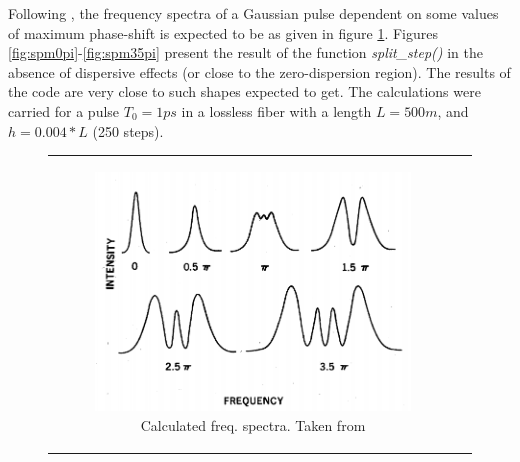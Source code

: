     Following \citep{stolen}, the frequency spectra of a Gaussian pulse dependent on some values of maximum phase-shift is expected to be as given in figure \ref{fig:spmstol}. Figures \ref{fig:spm0pi}-\ref{fig:spm35pi} present the result of the function \emph{split\_step()} in the absence of dispersive effects (or close to the zero-dispersion region). The results of the code are very close to such shapes expected to get. The calculations were carried for a pulse $T_0 = 1ps$ in a lossless fiber with a length $L = 500m$, and $h = 0.004*L$ (250 steps).
    
     \begin{figure}[label={fig:spmssfm}, caption={Shape of the spectra for Gaussian pulses by maximum phase shift ($\phi_{NL}$).}]
         \centering	
         \begin{tabular}[c]{cc}
         \centering	
        \begin{subfigure}[b]{.53\textwidth}
		    \centering	
            \includegraphics[width=1\linewidth]{figures/chap3/ssfm_spm/stolen_SPM.png}
            \caption{Calculated freq. spectra. Taken from \citep{stolen}}
            \label{fig:spmstol}
        \end{subfigure}
        \hfill
        \begin{subfigure}[b]{.53\textwidth}
		    \centering	

\end{subfigure}
\end{tabular}
\end{figure}
